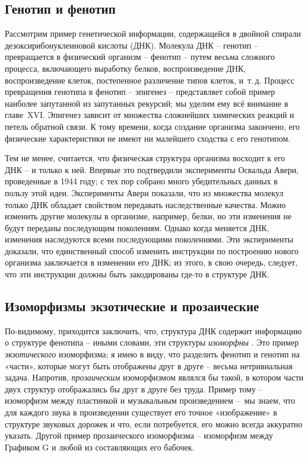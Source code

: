 \documentclass[../main.tex]{subfiles}
\begin{document}
\subsection{Генотип и фенотип}

Рассмотрим пример генетической информации, содержащейся в двойной спирали дезоксирибонуклеиновой кислоты (ДНК). Молекула ДНК \--- генотип \--- превращается в физический организм \--- фенотип \--- путем весьма сложного процесса, включающего выработку белков, воспроизведение ДНК, воспроизведение клеток, постепенное различение типов клеток, и~т.\,д. Процесс превращения генотипа в фенотип \--- эпигенез \--- представляет собой пример наиболее запутанной из запутанных рекурсий; мы уделим ему всё внимание в главе~XVI. Эпигенез зависит от множества сложнейших химических реакций и петель обратной связи. К тому времени, когда создание организма закончено, его физические характеристики не имеют ни малейшего сходства с его генотипом.

Тем не менее, считается, что физическая структура организма восходит к его ДНК \--- и только к ней. Впервые это подтвердили эксперименты Освальда Авери, проведенные в 1944 году; с тех пор собрано много убедительных данных в пользу этой идеи. Эксперименты Авери показали, что из множества молекул только ДНК обладает свойством передавать наследственные качества. Можно изменить другие молекулы в организме, например, белки, но эти изменения не будут переданы последующим поколениям. Однако когда меняется ДНК, изменения наследуются всеми последующими поколениями. Эти эксперименты доказали, что единственный способ изменить инструкции по построению нового организма заключается в изменении его ДНК; из этого, в свою очередь, следует, что эти инструкции должны быть закодированы где-то в структуре ДНК\@.


\subsection{Изоморфизмы экзотические и прозаические}

По-видимому, приходится заключить, что, структура ДНК содержит информацию о структуре фенотипа \--- иными словами, эти структуры \emph{изоморфны} . Это пример \emph{экзотического} изоморфизма; я имею в виду, что разделить фенотип и генотип на «части», которые могут быть отображены друг в друге \--- весьма нетривиальная задача. Напротив, \emph{прозаическим} изоморфизмом являлся бы такой, в котором части двух структур отображались бы друг в друге без труда. Пример тому \--- изоморфизм между пластинкой и музыкальным произведением \---~мы знаем, что для каждого звука в произведении существует его точное «изображение» в структуре звуковых дорожек и что, если потребуется, его можно всегда аккуратно указать. Другой пример прозаического изоморфизма \--- изоморфизм между Графиком G и любой из составляющих его бабочек.
\end{document}
